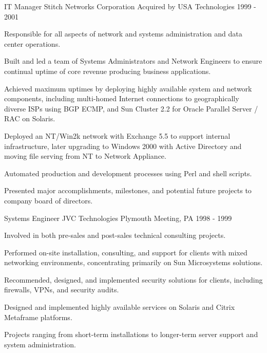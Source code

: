 \begin{cventries}

\cventry
{IT Manager} %
{Stitch Networks Corporation} %
{Acquired by USA Technologies} %
{1999 - 2001} %
{ %
\begin{cvitems}
\item { Responsible for all aspects of network and systems administration and data center operations.}
\item {Built and led a team of Systems Administrators and Network Engineers to ensure continual uptime of core revenue producing business applications.}
\item { Achieved maximum uptimes by deploying highly available system and network components, including multi-homed Internet connections to geographically diverse ISPs using BGP ECMP, and Sun Cluster 2.2 for Oracle Parallel Server / RAC on Solaris.}
\item { Deployed an NT/Win2k network with Exchange 5.5 to support internal infrastructure, later upgrading to Windows 2000 with Active Directory and moving file serving from NT to Network Appliance.}
\item { Automated production and development processes using Perl and shell scripts.}
\item { Presented major accomplishments, milestones, and potential future projects to company board of directors.}
\end{cvitems}
}


\cventry
{Systems Engineer} %
{JVC Technologies} %
{Plymouth Meeting, PA} %
{1998 - 1999} %
{ %
\begin{cvitems}
\item { Involved in both pre-sales and post-sales technical consulting projects.}
\item { Performed on-site installation, consulting, and support for clients with mixed networking environments, concentrating primarily on Sun Microsystems solutions.}
\item { Recommended, designed, and implemented security solutions for clients, including firewalls, VPNs, and security audits.}
\item { Designed and implemented highly available services on Solaris and Citrix Metaframe platforms.}
\item { Projects ranging from short-term installations to longer-term server support and system administration.}
\end{cvitems}
}


\end{cventries}
